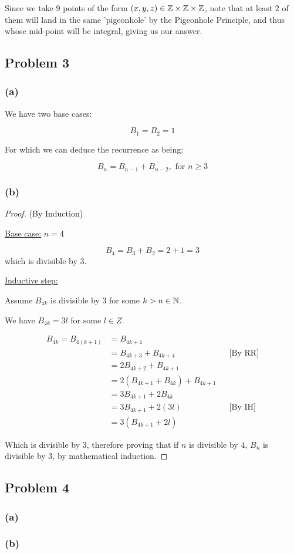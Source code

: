 \documentclass[10pt]{article}
\begin{document}
\noindent
Since we take 9 points of the form $(x, y, z) \in \mathbb{Z} \times \mathbb{Z} \times \mathbb{Z}$, note that at least $2$ of them will land
in the same 'pigeonhole' by the Pigeonhole Principle, and thus whose mid-point will be integral, giving us our answer.

\newpage
\subsection*{Problem 3}

\subsubsection*{(a)}

We have two base cases:

$$B_{1} = B_{2} = 1$$

\noindent
For which we can deduce the recurrence as being:

$$B_{n} = B_{n - 1} + B_{n - 2}, \text{ for }n \ge 3$$

\subsubsection*{(b)}

\begin{proof}
  (By Induction)
  \spacing

  \noindent
  \underline{Base case:} $n = 4$
  \spacing

  \noindent
  $$B_{4} = B_{3} + B_{2} = 2 + 1 = 3$$
  which is divisible by 3.
  \spacing

  \noindent
  \underline{Inductive step:}
  \spacing

  \noindent
  Assume $B_{4k}$ is divisible by 3 for some $k > n \in \mathbb{N}$.
  \spacing

  \noindent
  We have $B_{4k} = 3l \text{ for some } l \in Z$.

  \begin{align*}
    B_{4k} = B_{4(k + 1)} &= B_{4k + 4} \\
      &= B_{4k + 3} + B_{4k + 4} && \text{[By RR]} \\
      &= 2B_{4k + 2} + B_{4k + 1} \\
      &= 2(B_{4k + 1} + B_{4k}) + B_{4k + 1} \\
      &= 3B_{4k + 1} + 2B_{4k} \\
      &= 3B_{4k + 1} + 2(3l) && \text{[By IH]} \\
      &= 3(B_{4k + 1} + 2l)
  \end{align*}
  
  \noindent
  Which is divisible by 3, therefore proving that if $n$ is divisible by $4$, $B_{n}$ is divisible by 3,
  by mathematical induction.
\end{proof}

\newpage
\subsection*{Problem 4}

\subsubsection*{(a)}

\subsubsection*{(b)}
\end{document}
